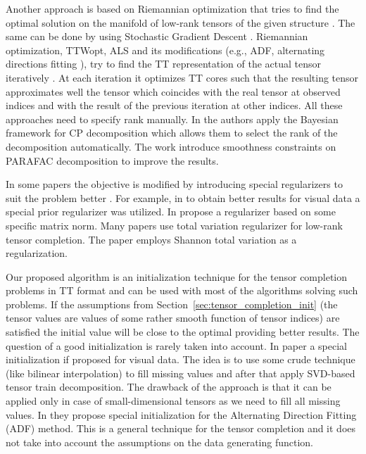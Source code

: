 Another approach is based on Riemannian optimization that tries to find the optimal solution on the manifold of low-rank tensors of the given structure \citep{steinlechner2016riemannian}. The same can be done by using Stochastic Gradient Descent \citep{yuan2017completion}. Riemannian optimization, TTWopt, ALS and its modifications (e.g., ADF, alternating directions fitting \citep{grasedyck2013alternating}), try to find the TT representation of the actual tensor iteratively \citep{phien2016efficient,grasedyck2015variants}.
At each iteration it optimizes TT cores such that the resulting tensor approximates well the tensor which coincides with the real tensor at observed indices and with the result of the previous iteration at other indices. All these approaches need to specify rank manually.
In \citep{suzuki2015convergence,zhao2015bayesian} the authors apply the Bayesian framework for CP decomposition which allows them to select the rank of the decomposition automatically.
The work \citep{yokota2016smooth} introduce smoothness constraints on PARAFAC decomposition to improve the results.

In some papers the objective is modified by introducing special regularizers to suit the problem better \citep{yokota2016smooth}. For example, in \citep{chen2013simultaneous,zhao2015bayesian} to obtain better results for visual data a special prior regularizer was utilized.
In \citep{chen2017denoising} propose a regularizer based on some specific matrix norm.
Many papers use total variation regularizer \citep{li2017low} for low-rank tensor completion.
The paper \cite{qin2020low} employs Shannon total variation as a regularization.

Our proposed algorithm is an initialization technique for the
tensor completion problems in TT format and can be used
with most of the algorithms solving such problems.
If the assumptions from Section~\ref{sec:tensor_completion_init} (the tensor values are values of some rather smooth function of tensor indices) are satisfied the initial value will be close to the optimal
providing better results.
The question of a good initialization is rarely taken into account.
In paper \citep{ko2018fast} a special initialization if proposed for visual data. The idea is to use some crude technique (like bilinear interpolation) to fill missing values and after that apply SVD-based tensor train decomposition.
The drawback of the approach is that it can be applied only in case of small-dimensional tensors as we need to fill all missing values.
In \citep{grasedyck2013alternating} they propose special initialization for the Alternating Direction Fitting (ADF) method.
This is a general technique for the tensor completion and it does not take into account the assumptions on the data generating function.
